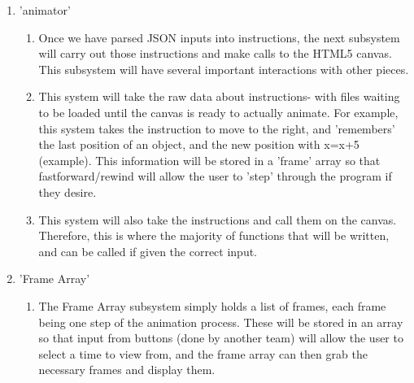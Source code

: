 \documentclass[12pt]{article}
\begin{document}
\begin{enumerate}
\begin{enumerate}
\end{enumerate}
\item 'animator'
\begin{enumerate}
\item Once we have parsed JSON inputs into instructions, the next subsystem will carry out those instructions and make calls to the HTML5 canvas. This subsystem will have several important interactions with other pieces.
\item This system will take the raw data about instructions- with files waiting to be loaded until the canvas is ready to actually animate. For example, this system takes the instruction to move to the right, and 'remembers' the last position of an object, and the new position with x=x+5 (example). This information will be stored in a 'frame' array so that fastforward/rewind will allow the user to 'step' through the program if they desire.
\item This system will also take the instructions and call them on the canvas. Therefore, this is where the majority of functions that will be written, and can be called if given the correct input.
\end{enumerate}

\item 'Frame Array'
\begin{enumerate}
\item The Frame Array subsystem simply holds a list of frames, each frame being one step of the animation process. These will be stored in an array so that input from buttons (done by another team) will allow the user to select a time to view from, and the frame array can then grab the necessary frames and display them. 
\end{enumerate}

\begin{enumerate}

\end{enumerate}



  \end{enumerate}

	
\end{document}

